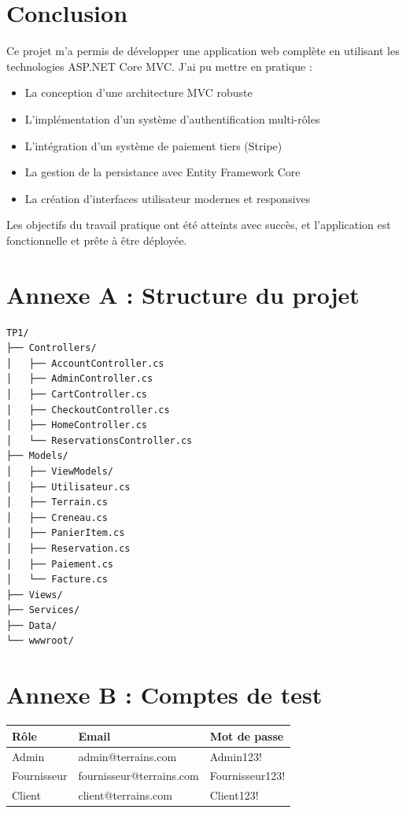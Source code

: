 \documentclass[12pt,a4paper]{article}
\begin{document}
\section{Conclusion}

Ce projet m'a permis de développer une application web complète en utilisant les technologies ASP.NET Core MVC. J'ai pu mettre en pratique :

\begin{itemize}
    \item La conception d'une architecture MVC robuste
    \item L'implémentation d'un système d'authentification multi-rôles
    \item L'intégration d'un système de paiement tiers (Stripe)
    \item La gestion de la persistance avec Entity Framework Core
    \item La création d'interfaces utilisateur modernes et responsives
\end{itemize}

Les objectifs du travail pratique ont été atteints avec succès, et l'application est fonctionnelle et prête à être déployée.

\appendix
\section{Annexe A : Structure du projet}

\begin{lstlisting}
TP1/
├── Controllers/
│   ├── AccountController.cs
│   ├── AdminController.cs
│   ├── CartController.cs
│   ├── CheckoutController.cs
│   ├── HomeController.cs
│   └── ReservationsController.cs
├── Models/
│   ├── ViewModels/
│   ├── Utilisateur.cs
│   ├── Terrain.cs
│   ├── Creneau.cs
│   ├── PanierItem.cs
│   ├── Reservation.cs
│   ├── Paiement.cs
│   └── Facture.cs
├── Views/
├── Services/
├── Data/
└── wwwroot/
\end{lstlisting}

\section{Annexe B : Comptes de test}

\begin{center}
\begin{tabular}{|l|l|l|}
\hline
\textbf{Rôle} & \textbf{Email} & \textbf{Mot de passe} \\
\hline
Admin & admin@terrains.com & Admin123! \\
Fournisseur & fournisseur@terrains.com & Fournisseur123! \\
Client & client@terrains.com & Client123! \\
\hline
\end{tabular}
\end{center}
\end{document}
